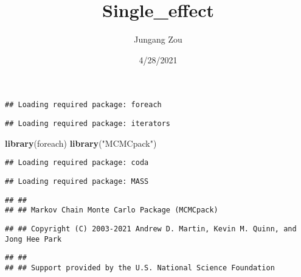 \documentclass[
]{article}
\title{Single\_effect}
\author{Jungang Zou}
\date{4/28/2021}
\newenvironment{Shaded}{\begin{snugshade}}{\end{snugshade}}
\newcommand{\CommentTok}[1]{\textcolor[rgb]{0.56,0.35,0.01}{\textit{#1}}}
\newcommand{\DataTypeTok}[1]{\textcolor[rgb]{0.13,0.29,0.53}{#1}}
\newcommand{\KeywordTok}[1]{\textcolor[rgb]{0.13,0.29,0.53}{\textbf{#1}}}
\newcommand{\NormalTok}[1]{#1}
\newcommand{\OperatorTok}[1]{\textcolor[rgb]{0.81,0.36,0.00}{\textbf{#1}}}
\newcommand{\OtherTok}[1]{\textcolor[rgb]{0.56,0.35,0.01}{#1}}
\newcommand{\StringTok}[1]{\textcolor[rgb]{0.31,0.60,0.02}{#1}}
\begin{document}
\maketitle

\begin{Shaded}
\end{Shaded}

\begin{verbatim}
## Loading required package: foreach
\end{verbatim}

\begin{verbatim}
## Loading required package: iterators
\end{verbatim}

\begin{Shaded}
\begin{Highlighting}[]
\KeywordTok{library}\NormalTok{(foreach)}
\KeywordTok{library}\NormalTok{(}\StringTok{"MCMCpack"}\NormalTok{)}
\end{Highlighting}
\end{Shaded}

\begin{verbatim}
## Loading required package: coda
\end{verbatim}

\begin{verbatim}
## Loading required package: MASS
\end{verbatim}

\begin{verbatim}
## ##
## ## Markov Chain Monte Carlo Package (MCMCpack)
\end{verbatim}

\begin{verbatim}
## ## Copyright (C) 2003-2021 Andrew D. Martin, Kevin M. Quinn, and Jong Hee Park
\end{verbatim}

\begin{verbatim}
## ##
## ## Support provided by the U.S. National Science Foundation
\end{verbatim}
\end{document}
